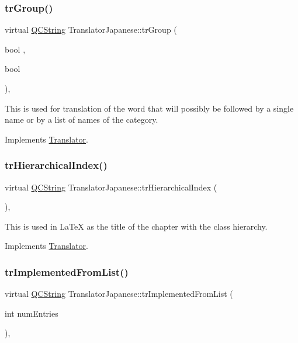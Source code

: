 \subsubsection{\texorpdfstring{trGroup()}{trGroup()}}
{\footnotesize\ttfamily virtual \mbox{\hyperlink{class_q_c_string}{Q\+C\+String}} Translator\+Japanese\+::tr\+Group (\begin{DoxyParamCaption}\item[{bool}]{,  }\item[{bool}]{ }\end{DoxyParamCaption})\hspace{0.3cm}{\ttfamily [inline]}, {\ttfamily [virtual]}}

This is used for translation of the word that will possibly be followed by a single name or by a list of names of the category. 

Implements \mbox{\hyperlink{class_translator}{Translator}}.

\mbox{\label{class_translator_japanese_ad3a716af39b29fc11c01c8f0f151fe17}} 
\subsubsection{\texorpdfstring{trHierarchicalIndex()}{trHierarchicalIndex()}}
{\footnotesize\ttfamily virtual \mbox{\hyperlink{class_q_c_string}{Q\+C\+String}} Translator\+Japanese\+::tr\+Hierarchical\+Index (\begin{DoxyParamCaption}{ }\end{DoxyParamCaption})\hspace{0.3cm}{\ttfamily [inline]}, {\ttfamily [virtual]}}

This is used in La\+TeX as the title of the chapter with the class hierarchy. 

Implements \mbox{\hyperlink{class_translator}{Translator}}.

\mbox{\label{class_translator_japanese_ac2e4cbb4cdbf04f217211f6035e6f20a}} 
\subsubsection{\texorpdfstring{trImplementedFromList()}{trImplementedFromList()}}
{\footnotesize\ttfamily virtual \mbox{\hyperlink{class_q_c_string}{Q\+C\+String}} Translator\+Japanese\+::tr\+Implemented\+From\+List (\begin{DoxyParamCaption}\item[{int}]{num\+Entries }\end{DoxyParamCaption})\hspace{0.3cm}{\ttfamily [inline]}, {\ttfamily [virtual]}}

